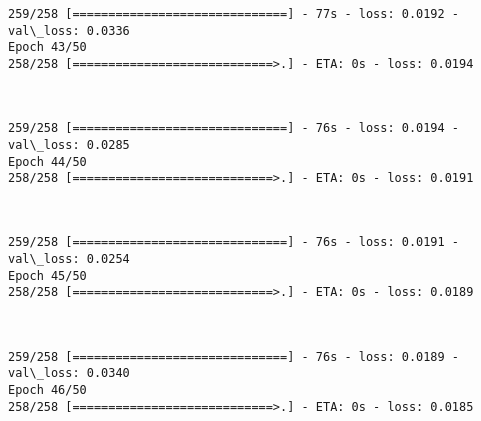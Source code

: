 \documentclass[11pt]{article}
\begin{document}
    \begin{Verbatim}[commandchars=\\\{\}]
259/258 [==============================] - 77s - loss: 0.0192 - val\_loss: 0.0336
Epoch 43/50
258/258 [============================>.] - ETA: 0s - loss: 0.0194
    \end{Verbatim}

    \begin{center}
    \end{center}
    { \hspace*{\fill} \\}
    
    \begin{Verbatim}[commandchars=\\\{\}]
259/258 [==============================] - 76s - loss: 0.0194 - val\_loss: 0.0285
Epoch 44/50
258/258 [============================>.] - ETA: 0s - loss: 0.0191
    \end{Verbatim}

    \begin{center}
    \end{center}
    { \hspace*{\fill} \\}
    
    \begin{Verbatim}[commandchars=\\\{\}]
259/258 [==============================] - 76s - loss: 0.0191 - val\_loss: 0.0254
Epoch 45/50
258/258 [============================>.] - ETA: 0s - loss: 0.0189
    \end{Verbatim}

    \begin{center}
    \end{center}
    { \hspace*{\fill} \\}
    
    \begin{Verbatim}[commandchars=\\\{\}]
259/258 [==============================] - 76s - loss: 0.0189 - val\_loss: 0.0340
Epoch 46/50
258/258 [============================>.] - ETA: 0s - loss: 0.0185
    \end{Verbatim}

    \begin{center}
    \end{center}
    { \hspace*{\fill} \\}
    
\end{document}
